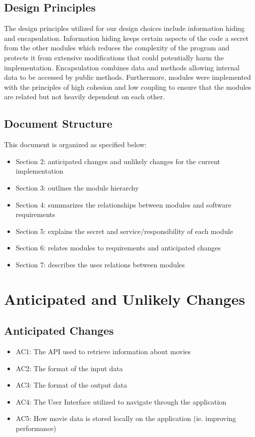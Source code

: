 \documentclass[12pt, titlepage]{article}
\begin{document}
\subsection{Design Principles}
The design principles utilized for our design choices include information hiding and encapsulation. Information hiding keeps certain aspects of the code a secret from the other modules which reduces the complexity of the program and protects it from extensive modifications that could potentially harm the implementation. Encapsulation combines data and methods allowing internal data to be accessed by public methods. Furthermore, modules were implemented with the principles of high cohesion and low coupling to ensure that the modules are related but not heavily dependent on each other.

\subsection{Document Structure}
This document is organized as specified below:
\begin{itemize}
	\item Section 2: anticipated changes and unlikely changes for the current implementation
	\item Section 3: outlines the module hierarchy 
	\item Section 4: summarizes the relationships between modules and software requirements
	\item Section 5: explains the secret and service/responsibility of each module
	\item Section 6: relates modules to requirements and anticipated changes 
	\item Section 7: describes the uses relations between modules
\end{itemize}

\section{Anticipated and Unlikely Changes} \label{SecChange}
\subsection{Anticipated Changes} \label{SecAchange}
\begin{itemize}
	\item AC1: The API used to retrieve information about movies 
	\item AC2: The format of the input data
	\item AC3: The format of the output data
	\item AC4: The User Interface utilized to navigate through the application
	\item AC5: How movie data is stored locally on the application (ie. improving performance)
\end{itemize}
\end{document}
